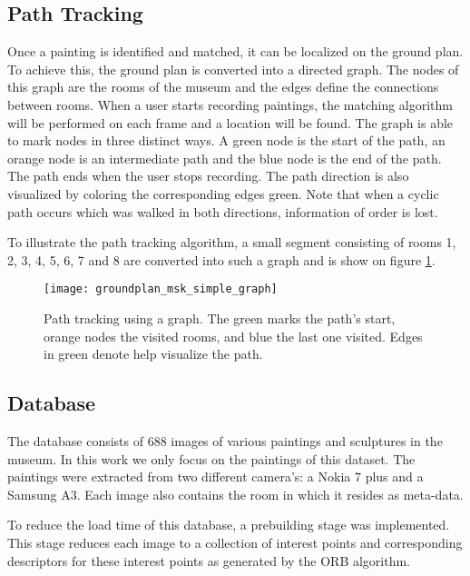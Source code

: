 	\subsection{Path Tracking}
	Once a painting is identified and matched, it can be localized on the ground plan. To achieve this, the ground plan is converted into a directed graph. The nodes of this graph are the rooms of the museum and the edges define the connections between rooms. When a user starts recording paintings, the matching algorithm will be performed on each frame and a location will be found. The graph is able to mark nodes in three distinct ways. A green node is the start of the path, an orange node is an intermediate path and the blue node is the end of the path. The path ends when the user stops recording. The path direction is also visualized by coloring the corresponding edges green. Note that when a cyclic path occurs which was walked in both directions, information of order is lost.
	
	
	
	
	To illustrate the path tracking algorithm,  a small segment consisting of rooms 1, 2, 3, 4, 5, 6, 7 and 8 are converted into such a graph and is show on figure \ref{fig:groundplan_msk_simple_graph}.
	
	

	\begin{figure}
		\texttt{[image: groundplan\_msk\_simple\_graph]}
		\caption{Path tracking using a graph. The green marks the path's start, orange nodes the visited rooms, and blue the last one visited. Edges in green denote help visualize the path.}
		\label{fig:groundplan_msk_simple_graph}
	\end{figure}
	
	\subsection{Database}
	The database consists of 688 images of various paintings and sculptures in the museum. In this work we only focus on the paintings of this dataset. The paintings were extracted from two different camera's: a Nokia 7 plus and a Samsung A3. Each image also contains the room in which it resides as meta-data.  
	
	To reduce the load time of this database, a prebuilding stage was implemented. This stage reduces each image to a collection of interest points and corresponding descriptors for these interest points as generated by the ORB \cite{Rublee2011} algorithm. 